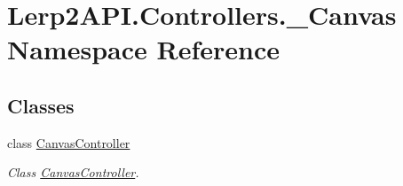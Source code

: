 \hypertarget{namespace_lerp2_a_p_i_1_1_controllers_1_1___canvas}{}\section{Lerp2\+A\+P\+I.\+Controllers.\+\_\+\+Canvas Namespace Reference}
\label{namespace_lerp2_a_p_i_1_1_controllers_1_1___canvas}
\subsection*{Classes}
\begin{DoxyCompactItemize}
\item 
class \hyperlink{class_lerp2_a_p_i_1_1_controllers_1_1___canvas_1_1_canvas_controller}{Canvas\+Controller}
\begin{DoxyCompactList}\small\item\em Class \hyperlink{class_lerp2_a_p_i_1_1_controllers_1_1___canvas_1_1_canvas_controller}{Canvas\+Controller}. \end{DoxyCompactList}\end{DoxyCompactItemize}

